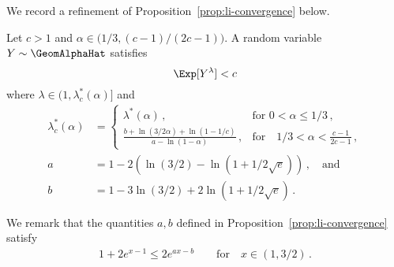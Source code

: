 We record a refinement of Proposition~\ref{prop:li-convergence} below.

\begin{proposition}\label{prop:li-convergence-absolute}
Let $c > 1$ and $\alpha \in \big(1/3, (c-1)/(2c-1) \big)$. 
A random variable $Y \sim \GeomAlphaHat$ satisfies
\begin{equation}\label{eq:li-convergence-absolute}
    \Exp[Y^\lambda] 
    < c
\end{equation}
where $\lambda \in \big(1, \lambda^*_c(\alpha)\big]$ 
and 
\begin{align}\label{eq:lambda-star-c}
    \lambda^*_c(\alpha) &= \begin{cases}
    \lambda^*(\alpha)\,, &\text{for } 0 < \alpha \leq 1/3\,,\\
    \frac{b + \ln(3/2\alpha) + \ln(1-1/c)}{a-\ln(1-\alpha)}
        \,, &\text{for}\quad 1/3 < \alpha < \frac{c-1}{2c-1}\,,
    \end{cases}\\
        a&= 1 - 2\left( \ln(3/2)-\ln(1+1/2\sqrt{e}) \right)\,,\quad\text{and} \nonumber \\
        b&=1-3\ln(3/2)+2\ln(1+1/2\sqrt{e}) \nonumber \,.
\end{align}
\end{proposition}
We remark that the quantities $a,b$ defined in Proposition~\ref{prop:li-convergence} satisfy
\begin{align}\label{eq:lambda-a-b-upperbound}
    1 + 2e^{x-1} \leq 2 e^{a x - b}
    \qquad\text{for}\quad x \in (1, 3/2)
    \, .
\end{align}
